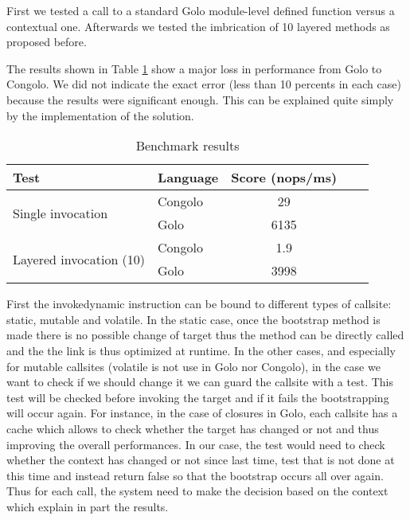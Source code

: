 \documentclass{sig-alternate}
\begin{document}
First we tested a call to a standard Golo module-level defined function versus a contextual one. Afterwards we tested the imbrication of 10 layered methods as proposed before.

The results shown in Table \ref{table:benchmarking} show a major loss in performance from Golo to Congolo. We did not indicate the exact error (less than 10 percents in each case) because the results were significant enough. This can be explained quite simply by the implementation of the solution. 

\begin{table}
\begin{adjustbox}{center}
\begin{tabular}{l p{2cm} | c | c | c | }
        \hline
                Test & Language & Score (nops/ms) \\
                
        \hline
        \multirow{2}{*}{Single invocation} 
                & Congolo & 29 \\
                & Golo & 6135 \\

        \hline
    \multirow{2}{*}{Layered invocation (10)} 
                & Congolo & 1.9 \\
                & Golo & 3998\\                 
\end{tabular}
\end{adjustbox}
        \caption{Benchmark results}
        \label{table:benchmarking}
\end{table}

First the invokedynamic instruction can be bound to different types of callsite: static, mutable and volatile. In the static case, once the bootstrap method is made there is no possible change of target thus the method can be directly called and the the link is thus optimized at runtime. In the other cases, and especially for mutable callsites (volatile is not use in Golo nor Congolo), in the case we want to check if we should change it we can guard the callsite with a test. This test will be checked before invoking the target and if it fails the bootstrapping will occur again. For instance, in the case of closures in Golo, each callsite has a cache which allows to check whether the target has changed or not and thus improving the overall performances. In our case, the test would need to check whether the context has changed or not since last time, test that is not done at this time and instead return false so that the bootstrap occurs all over again. Thus for each call, the system need to make the decision based on the context which explain in part the results.
\end{document}
